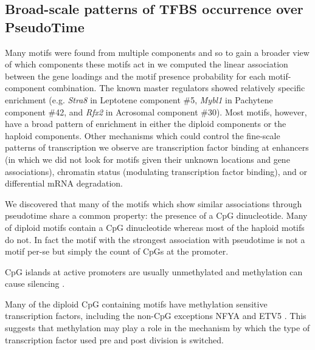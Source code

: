 \subsection{Broad-scale patterns of TFBS occurrence over PseudoTime}
Many motifs were found from multiple components and so to gain a broader view of which components these motifs act in we computed the linear association between the gene loadings and the motif presence probability for each motif-component combination. The known master regulators showed relatively specific enrichment (e.g. \textit{Stra8} in Leptotene component \#5, \textit{Mybl1} in Pachytene component \#42, and \textit{Rfx2} in Acrosomal component \#30). Most motifs, however, have a broad pattern of enrichment in either the diploid components or the haploid components. Other mechanisms which could control the fine-scale patterns of transcription we observe are transcription factor binding at enhancers (in which we did not look for motifs given their unknown locations and gene associations), chromatin status (modulating transcription factor binding), and or differential mRNA degradation.

We discovered that many of the motifs which show similar associations through pseudotime share a common property: the presence of a CpG dinucleotide. Many of diploid motifs contain a CpG dinucleotide whereas most of the haploid motifs do not. In fact the motif with the strongest association with pseudotime is not a motif per-se but simply the count of CpGs at the promoter.

CpG islands at active promoters are usually unmethylated and methylation can cause silencing \parencite{Li2014DNA}. 

Many of the diploid CpG containing motifs have methylation sensitive transcription factors, including the non-CpG exceptions NFYA and ETV5 \parencite{Domcke2015Competition, Wang2017NRF1}. This suggests that methylation may play a role in the mechanism by which the type of transcription factor used pre and post division is switched.

